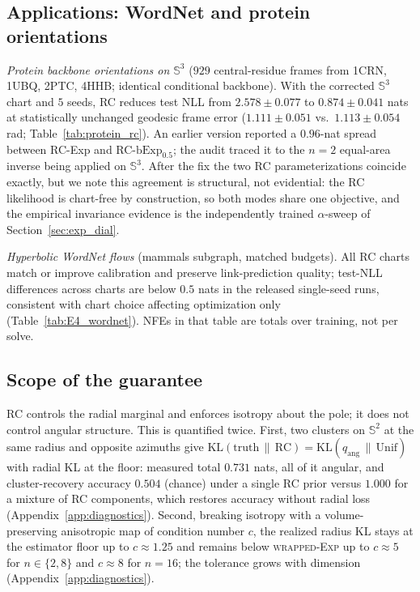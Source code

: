 \documentclass{article}
\newcommand{\KL}{\mathrm{KL}}
\theoremstyle{definition}
\theoremstyle{remark}
\newcommand{\RawExp}{\textsc{wrapped-Exp}}
\newcommand{\bExp}{\mathrm{bExp}}
\newcommand{\SSS}{\mathbb{S}}
\begin{document}
\subsection{Applications: WordNet and protein orientations}
\label{sec:exp_applications}
\emph{Protein backbone orientations on $\SSS^3$} ($929$ central-residue frames from 1CRN, 1UBQ, 2PTC, 4HHB; identical conditional backbone). With the corrected $\SSS^3$ chart and $5$ seeds, RC reduces test NLL from $2.578\pm0.077$ to $0.874\pm0.041$ nats at statistically unchanged geodesic frame error ($1.111\pm0.051$ vs.\ $1.113\pm0.054$ rad; Table~\ref{tab:protein_rc}). An earlier version reported a $0.96$-nat spread between RC-Exp and RC-$\bExp_{0.5}$; the audit traced it to the $n{=}2$ equal-area inverse being applied on $\SSS^3$. After the fix the two RC parameterizations coincide exactly, but we note this agreement is structural, not evidential: the RC likelihood is chart-free by construction, so both modes share one objective, and the empirical invariance evidence is the independently trained $\alpha$-sweep of Section~\ref{sec:exp_dial}.

\emph{Hyperbolic WordNet flows} (mammals subgraph, matched budgets). All RC charts match or improve calibration and preserve link-prediction quality; test-NLL differences across charts are below $0.5$ nats in the released single-seed runs, consistent with chart choice affecting optimization only (Table~\ref{tab:E4_wordnet}). NFEs in that table are totals over training, not per solve.

\subsection{Scope of the guarantee}
\label{sec:exp_limits}
RC controls the radial marginal and enforces isotropy about the pole; it does not control angular structure. This is quantified twice. First, two clusters on $\SSS^2$ at the same radius and opposite azimuths give $\KL(\text{truth}\,\|\,\text{RC})=\KL(q_{\text{ang}}\,\|\,\mathrm{Unif})$ with radial KL at the floor: measured total $0.731$ nats, all of it angular, and cluster-recovery accuracy $0.504$ (chance) under a single RC prior versus $1.000$ for a mixture of RC components, which restores accuracy without radial loss (Appendix~\ref{app:diagnostics}). Second, breaking isotropy with a volume-preserving anisotropic map of condition number $c$, the realized radius KL stays at the estimator floor up to $c\approx1.25$ and remains below \RawExp{} up to $c\approx5$ for $n\in\{2,8\}$ and $c\approx8$ for $n{=}16$; the tolerance grows with dimension (Appendix~\ref{app:diagnostics}).
\end{document}
